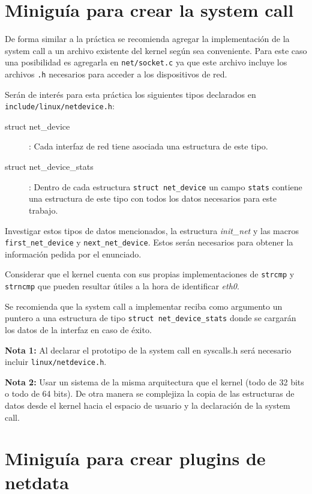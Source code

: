 \section{Miniguía para crear la system call}

De forma similar a la práctica se recomienda agregar la implementación de
la system call a un archivo
existente del kernel según sea conveniente. Para este caso una posibilidad es
agregarla en \texttt{net/socket.c} ya que este archivo incluye los archivos
\texttt{.h} necesarios para acceder a los dispositivos de red.

Serán de interés para esta práctica los siguientes tipos declarados en\\
\texttt{include/linux/netdevice.h}:

\begin{description}
    \item [struct net\_device]: Cada interfaz de red tiene asociada una
    estructura de este tipo.
    \item [struct net\_device\_stats]: Dentro de cada
        estructura \verb+struct net_device+ un campo \verb+stats+ contiene una
        estructura de este tipo con todos los datos necesarios para este
        trabajo.
\end{description}

Investigar estos tipos de datos mencionados, la estructura \textit{init\_net} y
las macros\\
\texttt{first\_net\_device} y \texttt{next\_net\_device}. Estos serán
necesarios para obtener la información pedida por el enunciado.

Considerar que el kernel cuenta con sus propias implementaciones de
\texttt{strcmp} y \texttt{strncmp} que pueden resultar útiles a la hora de
identificar \textit{eth0}.

Se recomienda que la system call a implementar reciba como argumento un puntero
a una estructura de tipo \verb+struct net_device_stats+ donde se cargarán los
datos de la interfaz en caso de éxito.

\textbf{Nota 1:} Al declarar el prototipo de la system call en syscalls.h será
necesario incluir \texttt{linux/netdevice.h}.

\textbf{Nota 2:} Usar un sistema de la misma
arquitectura que el kernel (todo de 32 bits o todo de 64 bits). De otra manera
se complejiza la copia de las estructuras de datos desde el kernel hacia el
espacio de usuario y la declaración de la system call.

\section{Miniguía para crear plugins de netdata}

